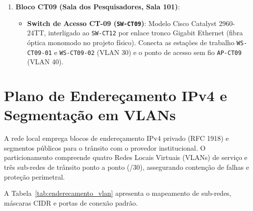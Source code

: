\begin{enumerate}
\begin{itemize}
    \end{itemize}
    \item \textbf{Bloco CT09 (Sala dos Pesquisadores, Sala 101)}:
    \begin{itemize}
        \item \textbf{Switch de Acesso CT-09 (\texttt{SW-CT09})}: Modelo Cisco Catalyst 2960-24TT, interligado ao \texttt{SW-CT12} por enlace tronco Gigabit Ethernet (fibra óptica monomodo no projeto físico). Conecta as estações de trabalho \texttt{WS-CT09-01} e \texttt{WS-CT09-02} (VLAN 30) e o ponto de acesso sem fio \texttt{AP-CT09} (VLAN 40).
    \end{itemize}
\end{enumerate}


\section{Plano de Endereçamento IPv4 e Segmentação em VLANs}

A rede local emprega blocos de endereçamento IPv4 privado (RFC 1918) e segmentos públicos para o trânsito com o provedor institucional. O particionamento compreende quatro Redes Locais Virtuais (VLANs) de serviço e três sub-redes de trânsito ponto a ponto (/30), assegurando contenção de falhas e proteção perimetral.

A Tabela~\ref{tab:enderecamento_vlan} apresenta o mapeamento de sub-redes, máscaras CIDR e portas de conexão padrão.

